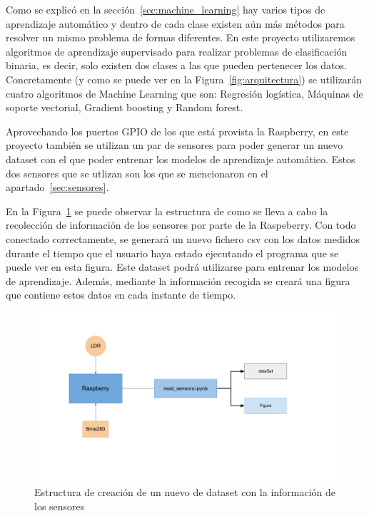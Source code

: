 \documentclass[a4paper, 12pt]{book}
\begin{document}
Como se explicó en la sección~\ref{sec:machine_learning} hay varios tipos de aprendizaje automático y dentro de cada clase existen aún más métodos para resolver un mismo problema de formas diferentes. En este proyecto utilizaremos algoritmos de aprendizaje supervisado para realizar problemas de clasificación binaria, es decir, solo existen dos clases a las que pueden pertenecer los datos. Concretamente (y como se puede ver en la Figura~\ref{fig:arquitectura}) se utilizarán cuatro algoritmos de Machine Learning que son: Regresión logística, Máquinas de soporte vectorial, Gradient boosting y Random forest.

Aprovechando los puertos GPIO de los que está provista la Raspberry, en este proyecto también se utilizan un par de sensores para poder generar un nuevo dataset con el que poder entrenar los modelos de aprendizaje automático. Estos dos sensores que se utlizan son los que se mencionaron en el apartado~\ref{sec:sensores}.

En la Figura~\ref{fig:esquema_sensores} se puede observar la estructura de como se lleva a cabo la recolección de información de los sensores por parte de la Raspeberry. Con todo conectado correctamente, se generará un nuevo fichero csv con los datos medidos durante el tiempo que el usuario haya estado ejecutando el programa que se puede ver en esta figura. Este dataset podrá utilizarse para entrenar los modelos de aprendizaje. Además, mediante la información recogida se creará una figura que contiene estos datos en cada instante de tiempo.

\begin{figure}[]
  \centering
  \includegraphics[width=14cm, keepaspectratio]{img/esquema_sensores.png}
  \caption{Estructura de creación de un nuevo de dataset con la información de los sensores}\label{fig:esquema_sensores}
\end{figure}
\end{document}
